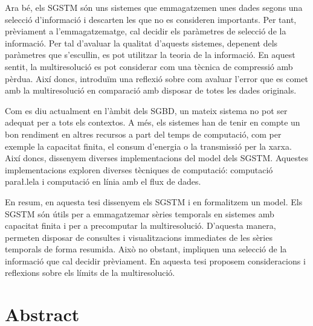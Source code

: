 Ara bé, els \gls{SGSTM} són uns sistemes que emmagatzemen unes dades
segons una selecció d'informació i descarten les que no es consideren
importants. Per tant, prèviament a l'emmagatzematge, cal decidir els
paràmetres de selecció de la informació. Per tal d'avaluar la qualitat
d'aquests sistemes, depenent dels paràmetres que s'escullin, es pot
utilitzar la teoria de la informació. En aquest sentit, la
multiresolució es pot considerar com una tècnica de compressió amb
pèrdua. Així doncs, introduïm una reflexió sobre com avaluar l'error
que es comet amb la multiresolució en comparació amb disposar de totes
les dades originals.


Com es diu actualment en l'àmbit dels \gls{SGBD}, un mateix sistema no
pot ser adequat per a tots els contextos. A més, els sistemes han de
tenir en compte un bon rendiment en altres recursos a part del temps
de computació, com per exemple la capacitat finita, el consum
d'energia o la transmissió per la xarxa. Així doncs, dissenyem
diverses implementacions del model dels \gls{SGSTM}. Aquestes
implementacions exploren diverses tècniques de computació: computació
para\l.lela i computació en línia amb el flux de dades.


En resum, en aquesta tesi dissenyem els \gls{SGSTM} i en formalitzem
un model.  Els \gls{SGSTM} són útils per a emmagatzemar sèries
temporals en sistemes amb capacitat finita i per a precomputar la
multiresolució. D'aquesta manera, permeten disposar de consultes i
visualitzacions immediates de les sèries temporals de forma
resumida. Això no obstant, impliquen una selecció de la informació que
cal decidir prèviament. En aquesta tesi proposem consideracions i
reflexions sobre els límits de la multiresolució.





\chapter*{Abstract}









